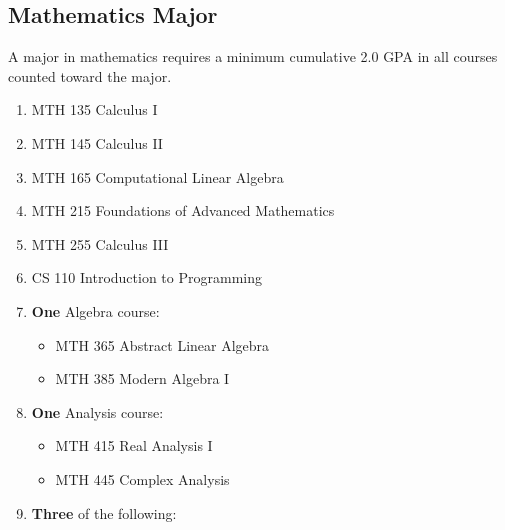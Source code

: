 \documentclass[
  letterpaper,
]{scrbook}
\providecommand{\tightlist}{%
  \setlength{\itemsep}{0pt}\setlength{\parskip}{0pt}}
\begin{document}
\subsection{Mathematics Major}\label{mathematics-major}

A major in mathematics requires a minimum cumulative 2.0 GPA in all
courses counted toward the major.

\begin{enumerate}
\def\labelenumi{\arabic{enumi}.}
\tightlist
\item
  MTH 135 Calculus I\\
\item
  MTH 145 Calculus II\\
\item
  MTH 165 Computational Linear Algebra\\
\item
  MTH 215 Foundations of Advanced Mathematics\\
\item
  MTH 255 Calculus III\\
\item
  CS 110 Introduction to Programming\\
\item
  \textbf{One} Algebra course:

  \begin{itemize}
  \tightlist
  \item
    MTH 365 Abstract Linear Algebra\\
  \item
    MTH 385 Modern Algebra I\\
  \end{itemize}
\item
  \textbf{One} Analysis course:

  \begin{itemize}
  \tightlist
  \item
    MTH 415 Real Analysis I\\
  \item
    MTH 445 Complex Analysis\\
  \end{itemize}
\item
  \textbf{Three} of the following:


\end{enumerate}
\end{document}
